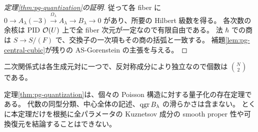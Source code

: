 \begin{proof}[定理\ref{thm:pg-quantization}の証明]
従って各 fiber に
$0\to A_\lambda(-3)\xrightarrow{\Omega_\lambda}A_\lambda\to B_\lambda\to0$
があり、所要の Hilbert 級数を得る。
各次数の余核は PID $\mathcal O(U)$ 上で全 fiber 次元が一定なので有限自由である。
法 $\hbar$ での商は $S\to S/(F)$ で、交換子の一次項もその商の括弧と一致する。
補題\ref{lem:pg-central-cubic}が残りの AS-Gorenstein の主張を与える。
\end{proof}
二次関係式は各生成元対に一つで、反対称成分により独立なので個数は $\binom N2$ である。
\begin{remark}\label{rem:pg-quantization-scope}
定理\ref{thm:pg-quantization}は、個々の Poisson 構造に対する量子化の存在定理である。
代数の同型分類、中心全体の記述、$\operatorname{qgr} B_\lambda$ の滑らかさは含まない。
とくに本定理だけを根拠に全パラメータの Kuznetsov 成分の smooth proper 性や可換復元を結論することはできない。
\end{remark}

